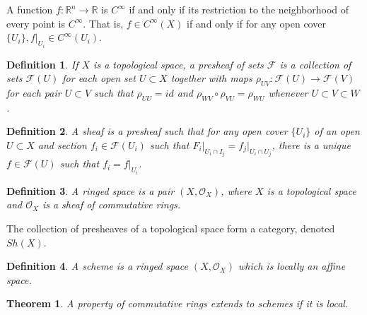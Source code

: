 \documentclass[oneside]{book}
\theoremstyle{mystyle}
\newtheorem{theorem}{Theorem}[section]
\newtheorem{definition}{Definition}[section]
\begin{document}
A function $f:\mathbb{R}^n \rightarrow \mathbb{R}$ is $C^{\infty}$ if and only if its restriction to the neighborhood of every point is $C^{\infty}$. That is, $f\in C^{\infty}(X)$ if and only if for any open cover $\{U_i\},f\big|_{U_i}\in C^{\infty}(U_i)$.
\begin{definition}
If $X$ is a topological space, a presheaf of sets $\mathcal{F}$ is a collection of sets $\mathcal{F}(U)$ for each open set $U\subset X$ together with maps $\rho_{UV}:\mathcal{F}(U)\rightarrow \mathcal{F}(V)$ for each pair $U\subset V$ such that $\rho_{UU} = id$ and $\rho_{WV}\circ \rho_{VU} = \rho_{WU}$ whenever $U\subset V \subset W$.
\end{definition}
\begin{definition}
A sheaf is a presheaf such that for any open cover $\{U_i\}$ of an open $U\subset X$ and section $f_i \in \mathcal{F}(U_i)$ such that $F_i\big|_{U_i\cap I_j} = f_j\big|_{U_i\cap U_j}$, there is a unique $f\in \mathcal{F}(U)$ such that $f_i = f\big|_{U_i}$.
\end{definition}
\begin{definition}
A ringed space is a pair $(X,\mathcal{O}_X)$, where $X$ is a topological space and $\mathcal{O}_X$ is a sheaf of commutative rings.
\end{definition}
The collection of presheaves of a topological space form a category, denoted $Sh(X)$. 
\begin{definition}
A scheme is a ringed space $(X,\mathcal{O}_X)$ which is locally an affine space.
\end{definition}
\begin{theorem}
A property of commutative rings extends to schemes if it is local.
\end{theorem}
\end{document}

